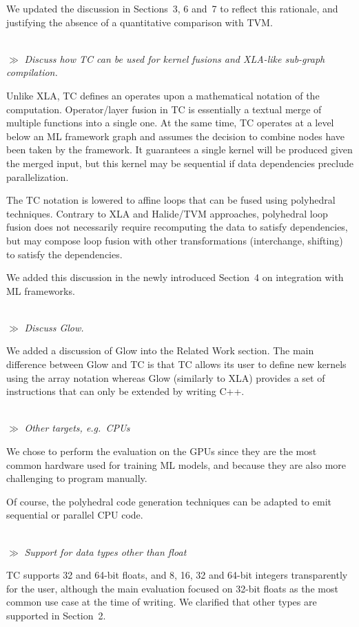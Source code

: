 \documentclass[letterpaper,11pt]{article}
\newcommand{\rev}[1]{~\\[0.5cm]{\tiny $\gg$} {\it #1}}
\begin{document}
We updated the discussion in Sections~3, 6 and~7 to reflect this
rationale, and justifying the absence of a quantitative comparison
with TVM.

\rev{Discuss how TC can be used for kernel fusions and XLA-like sub-graph
compilation.}

Unlike XLA, TC defines an operates upon a mathematical notation of the
computation.  Operator/layer fusion in TC is essentially a textual
merge of multiple functions into a single one.  At the same time, TC
operates at a level below an ML framework graph and assumes the
decision to combine nodes have been taken by the framework.  It
guarantees a single kernel will be produced given the merged input,
but this kernel may be sequential if data dependencies preclude
parallelization.

The TC notation is lowered to affine loops that can be fused using polyhedral
techniques.  Contrary to XLA and Halide/TVM approaches, polyhedral loop fusion
does not necessarily require recomputing the data to satisfy dependencies, but
may compose loop fusion with other transformations (interchange, shifting) to
satisfy the dependencies.

We added this discussion in the newly introduced Section~4 on integration with
ML frameworks.


\rev{Discuss Glow.}

We added a discussion of Glow into the Related Work section.  The main
difference between Glow and TC is that TC allows its user to define new kernels
using the array notation whereas Glow (similarly to XLA) provides a set of
instructions that can only be extended by writing C++.

\rev{Other targets, e.g.\ CPUs}

We chose to perform the evaluation on the GPUs since they are the most
common hardware used for training ML models, and because they are also
more challenging to program manually.

Of course, the polyhedral code generation techniques can be adapted to
emit sequential or parallel CPU code.

\rev{Support for data types other than float}

TC supports 32 and 64-bit floats, and 8, 16, 32 and 64-bit integers
transparently for the user, although the main evaluation focused on 32-bit
floats as the most common use case at the time of writing.  We clarified that
other types are supported in Section~2.
\end{document}
